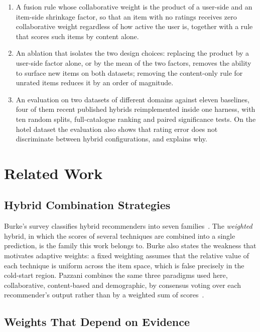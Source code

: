 \documentclass[runningheads]{llncs}
\begin{document}
\begin{enumerate}
  \item A fusion rule whose collaborative weight is the product of a user-side and an item-side shrinkage factor, so that an item with no ratings receives zero collaborative weight regardless of how active the user is, together with a rule that scores such items by content alone.
  \item An ablation that isolates the two design choices: replacing the product by a user-side factor alone, or by the mean of the two factors, removes the ability to surface new items on both datasets; removing the content-only rule for unrated items reduces it by an order of magnitude.
  \item An evaluation on two datasets of different domains against eleven baselines, four of them recent published hybrids reimplemented inside one harness, with ten random splits, full-catalogue ranking and paired significance tests. On the hotel dataset the evaluation also shows that rating error does not discriminate between hybrid configurations, and explains why.
\end{enumerate}

\section{Related Work}

\subsection{Hybrid Combination Strategies}

Burke's survey classifies hybrid recommenders into seven families~\cite{burke2002}. The \emph{weighted} hybrid, in which the scores of several techniques are combined into a single prediction, is the family this work belongs to. Burke also states the weakness that motivates adaptive weights: a fixed weighting assumes that the relative value of each technique is uniform across the item space, which is false precisely in the cold-start region. Pazzani combines the same three paradigms used here, collaborative, content-based and demographic, by consensus voting over each recommender's output rather than by a weighted sum of scores~\cite{pazzani1999}.

\subsection{Weights That Depend on Evidence}
\end{document}
